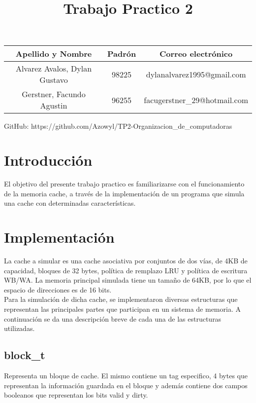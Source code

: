 \documentclass[a4paper,10pt]{article}
\begin{document}
\title{\textbf{Trabajo Practico 2}}

\maketitle

	\begin{table}[h!]
	  \centering
	  \begin{tabular}{ccc}
		\toprule
		Apellido y Nombre & Padrón & Correo electrónico	\\
		\midrule
		Alvarez Avalos, Dylan Gustavo & 98225 & dylanalvarez1995@gmail.com\\
		Gerstner, Facundo Agustin & 96255 & facugerstner\_29@hotmail.com\\
		\bottomrule
	  \end{tabular}
	\end{table}

    GitHub: https://github.com/Azowyl/TP2-Organizacion\_de\_computadoras

\date{}
\newpage

\thispagestyle{empty}


\section{Introducción}
  
   El objetivo del presente trabajo practico es familiarizarse con el funcionamiento de la memoria cache, a través de la implementación de un programa que simula una cache con determinadas características.


\section{Implementación}
    
    La cache a simular es una cache asociativa por conjuntos de dos vías, de 4KB de capacidad, bloques de 32 bytes, política de remplazo LRU y política de escritura WB/WA. La memoria principal simulada tiene un tamaño de 64KB, por lo que el espacio de direcciones es de 16 bits.\\
    Para la simulación de dicha cache, se implementaron diversas estructuras que representan las principales partes que participan en un sistema de memoria. A continuación se da una descripción breve de cada una de las estructuras utilizadas.\\
    
    \subsection{block\_t}
        Representa un bloque de cache. El mismo contiene un tag especifico, 4 bytes que representan la información guardada en el bloque y además contiene dos campos booleanos que representan los bits valid y dirty.\\
    
\end{document}
